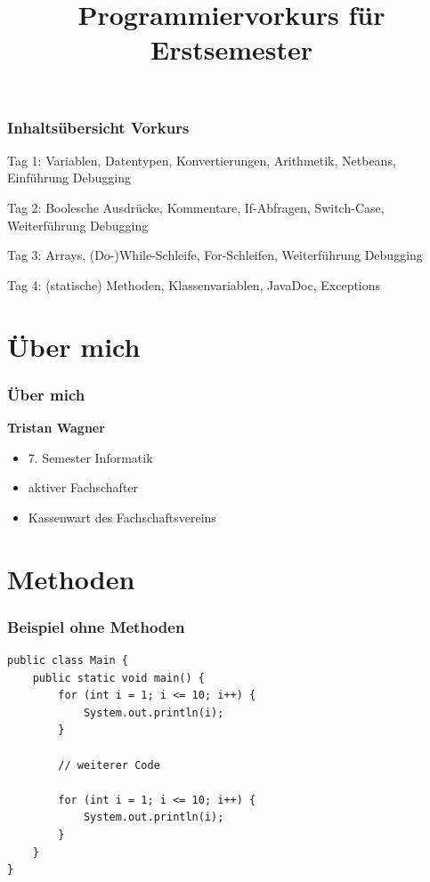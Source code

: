 \documentclass[final]{beamer}
\title{Programmiervorkurs für Erstsemester}
\begin{document}
\lstset{tabsize=4}
\lstset{basicstyle=\small}
\lstset{language=java}

\begin{frame}
  \titlepage
\end{frame}

\begin{frame}
	\frametitle{Inhaltsübersicht Vorkurs}
	\begin{itemize}
	{\color{gray}
		\item {Tag 1: Variablen, Datentypen, Konvertierungen, Arithmetik, Netbeans, Einführung Debugging}
		\item {Tag 2: Boolesche Ausdrücke, Kommentare, If-Abfragen, Switch-Case, Weiterführung Debugging}
		\item {Tag 3: Arrays, (Do-)While-Schleife, For-Schleifen, Weiterführung Debugging}
		{\color{black}
		\item {Tag 4: (statische) Methoden, Klassenvariablen, JavaDoc, Exceptions}
		}
	}
	\end{itemize}
\end{frame}

\section{Über mich}
\begin{frame}
	\frametitle{Über mich}
	\textbf{Tristan Wagner}
	\begin{itemize}
		\item{7. Semester Informatik}
		\item{aktiver Fachschafter}
		\item{Kassenwart des Fachschaftsvereins}
	\end{itemize}
\end{frame}

\section{Methoden}
\begin{frame}[containsverbatim]
	\frametitle{Beispiel ohne Methoden}
	\begin{lstlisting}
public class Main {
	public static void main() {
		for (int i = 1; i <= 10; i++) {
			System.out.println(i);
		}
		
		// weiterer Code
		
		for (int i = 1; i <= 10; i++) {
			System.out.println(i);
		}
	}
}
	\end{lstlisting}
\end{frame}
\end{document}
